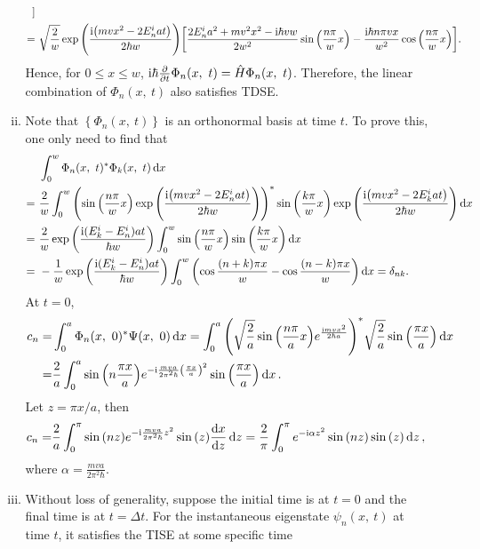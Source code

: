 \documentclass{article}
\newcommand{\iu}{\ensuremath{\mathrm{i}}}
\newcommand{\set}[1]{\ensuremath{\left\{{#1}\right\}}}
\begin{document}
\begin{enumerate}[1.]
\begin{enumerate}[(i)]
\begin{align*}
      ] \\
      =&\ \sqrt{\frac{2}{w}} \exp\qty(\frac{\iu\qty(mvx^2 - 2E_n^iat)}{2\hbar w})\qty[
        \frac{2E_n^i a^2 + mv^2x^2 -\iu\hbar vw}{2w^2} \sin\qty(\frac{n\pi}{w}x)  
        -\frac{\iu\hbar n\pi vx}{w^2} \cos\qty(\frac{n\pi}{w}x)
      ].
    \end{align*}
    Hence, for $0 \le x \le w$, $\iu\hbar \pdv{t} \Phi_n(x,\ t) = \hat{H}\Phi_n(x,\ t)$.
    Therefore, the linear combination of $\Phi_n(x,\ t)$ also satisfies TDSE.
    \item 
    Note that $\set{\Phi_n(x,\ t)}$ is an orthonormal basis at time $t$. To prove this, one only need to find that
    \begin{align*}
      &\ \int_0^w \Phi_n(x,\ t)^*\Phi_k(x,\ t) \dd{x} \\
      =&\ \frac{2}{w} \int_0^w \qty( \sin\qty(\frac{n\pi}{w}x) \exp\qty(\frac{\iu\qty(mvx^2 - 2E_n^iat)}{2\hbar w}) )^*
      \sin\qty(\frac{k\pi}{w}x)\exp\qty(\frac{\iu\qty(mvx^2 - 2E_k^iat)}{2\hbar w}) \dd{x}\\
      =&\ \frac{2}{w}\exp\qty(\frac{\iu(E_k^i - E_n^i)at}{\hbar w}) \int_0^w \sin\qty(\frac{n\pi}{w}x)\sin\qty(\frac{k\pi}{w}x) \dd{x} \\
      =&\ -\frac{1}{w}\exp\qty(\frac{\iu(E_k^i - E_n^i)at}{\hbar w}) \int_0^w \qty(\cos\frac{(n + k)\pi x}{w} - \cos\frac{(n - k)\pi x}{w}) \dd{x}  = \delta_{nk}.\\
    \end{align*}
    At $t=0$,
    \begin{align*}
      c_n =& \int_0^a \Phi_n(x,\ 0)^* \Psi(x,\ 0) \dd{x} = \int_0^a \qty( \sqrt{\frac{2}{a}}\sin\qty(\frac{n\pi}{a}x)e^{\frac{\iu mvx^2}{2\hbar a}})^*  \sqrt{\frac{2}{a}}\sin\qty(\frac{\pi x}{a}) \dd{x}\\
      =& \frac{2}{a} \int_0^a \sin\qty(n\frac{\pi x}{a})e^{-\iu\frac{mva}{2\pi^2\hbar} \qty(\frac{\pi x}{a})^2} \sin\qty(\frac{\pi x}{a}) \dd{x}.
    \end{align*}
    Let $z = \pi x /a$, then
    \begin{align*}
      c_n =& \frac{2}{a} \int_0^\pi \sin\qty(nz) e^{-\iu\frac{mva}{2\pi^2\hbar}z^2} \sin\qty(z) \dv{x}{z}\dd{z} = \frac{2}{\pi} \int_0^\pi e^{-\iu\alpha z^2} \sin\qty(nz) \sin\qty(z) \dd{z},
    \end{align*}
    where $\alpha = \frac{mva}{2\pi^2\hbar}$.
    \item 
    Without loss of generality, suppose the initial time is at $t = 0$ and the final time is at $t = \Delta t$.
    For the instantaneous eigenstate $\psi_n(x,\ t)$ at time $t$, it satisfies the TISE at some specific time

\end{enumerate}
\end{enumerate}
\end{document}
